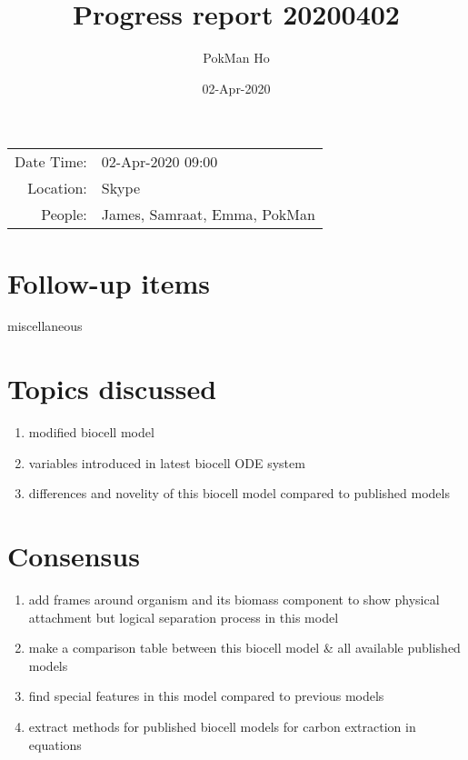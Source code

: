 \documentclass[a4paper,11pt]{article}
\title{Progress report 20200402}
\author{PokMan Ho}
\date{02-Apr-2020}
\begin{document}
    \maketitle
    
    \begin{tabular}{rl}
        Date Time: & 02-Apr-2020 09:00 \\
        Location: & Skype \\
        People: & James, Samraat, Emma, PokMan \\
    \end{tabular}
    
    \section{Follow-up items}
    miscellaneous
    
    \section{Topics discussed}
    \begin{enumerate}
        \item modified biocell model
        \item variables introduced in latest biocell ODE system
        \item differences and novelity of this biocell model compared to published models
    \end{enumerate}
    
    \section{Consensus}
    \begin{enumerate}
        \item add frames around organism and its biomass component to show physical attachment but logical separation process in this model
        \item make a comparison table between this biocell model \& all available published models
        \item find special features in this model compared to previous models
        \item extract methods for published biocell models for carbon extraction in equations
    \end{enumerate}
\end{document}
